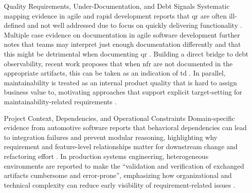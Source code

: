 \documentclass[12pt,reqno, twoside]{amsbook}
\makeatletter
\def\section{\@startsection{section}{1}%
      \z@{.5\linespacing\@plus.7\linespacing}{.25\linespacing}%
      {\normalfont\bfseries\flushleft}}
\theoremstyle{plain}
\numberwithin{equation}{chapter}
\numberwithin{section}{chapter}
\makeatother
\begin{document}
\section{Quality Requirements, Under-Documentation, and Debt Signals}
\noindent Systematic mapping evidence in agile and rapid development reports that \gls{qr} are often ill-defined and not well addressed due to focus on quickly delivering functionality \parencite{Behutiye2019}. Multiple case evidence on documentation in agile software development further notes that teams may interpret just enough documentation differently and that this might be detrimental when documenting \gls{qr} \parencite{Behutiye2022}. Building a direct bridge to debt observability, recent work proposes that when \gls{nfr} are not documented in the appropriate artifacts, this can be taken as an indication of \gls{td} \parencite{Scott2025}. In parallel, maintainability is treated as an internal product quality that is hard to assign business value to, motivating approaches that support explicit target-setting for maintainability-related requirements \parencite{Borg2025}.

\section{Project Context, Dependencies, and Operational Constraints}
\noindent Domain-specific evidence from automotive software reports that behavioral dependencies can lead to integration failures and prevent modular reasoning, highlighting why requirement and feature-level relationships matter for downstream change and refactoring effort \parencite{Vogelsang2020}. In production systems engineering, heterogeneous environments are reported to make the ``validation and verification of exchanged artifacts cumbersome and error-prone'', emphasizing how organizational and technical complexity can reduce early visibility of requirement-related issues \parencite{Waltersdorfer2020}.
\end{document}
